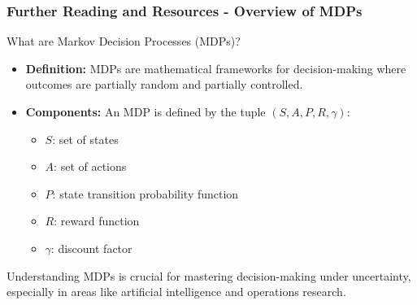 \documentclass[aspectratio=169]{beamer}
\begin{document}
\begin{frame}[fragile]
    \frametitle{Further Reading and Resources - Overview of MDPs}
    
    \begin{block}{What are Markov Decision Processes (MDPs)?}
        \begin{itemize}
            \item \textbf{Definition:} MDPs are mathematical frameworks for decision-making where outcomes are partially random and partially controlled.
            \item \textbf{Components:} An MDP is defined by the tuple \((S, A, P, R, \gamma)\):
            \begin{itemize}
                \item \(S\): set of states
                \item \(A\): set of actions
                \item \(P\): state transition probability function
                \item \(R\): reward function
                \item \(\gamma\): discount factor
            \end{itemize}
        \end{itemize}
    \end{block}

    Understanding MDPs is crucial for mastering decision-making under uncertainty, especially in areas like artificial intelligence and operations research.
\end{frame}
\end{document}
